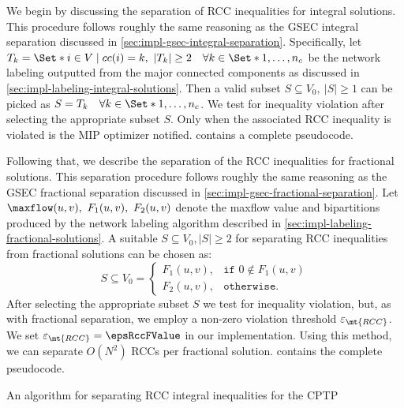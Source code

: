 We begin by discussing the separation of RCC inequalities for integral solutions.
This procedure follows roughly the same reasoning
as the GSEC integral separation discussed in \cref{sec:impl-gsec-integral-separation}.
Specifically, let $T_k  = \Set*{i \in V \mid cc(i) = k},\ |T_k| \ge 2 \quad \forall k \in \Set*{1, \dots, n_c}$
be the network labeling outputted from the major connected components as discussed in \cref{sec:impl-labeling-integral-solutions}.
Then a valid subset $S \subseteq V_0,\ |S| \ge 1$ can be picked as $S = T_k \quad \forall k \in \Set*{1, \dots, n_c}$.
We test for inequality violation after selecting the appropriate subset $S$.
Only when the associated RCC inequality is violated is the MIP optimizer notified.
 contains a complete pseudocode.

Following that, we describe the separation of the RCC inequalities for fractional solutions.
This separation procedure follows roughly the same reasoning
as the GSEC fractional separation discussed in \cref{sec:impl-gsec-fractional-separation}.
Let $\maxflow(u, v),\ F_1(u, v),\ F_2(u, v)$ denote the maxflow value and bipartitions
produced by the network labeling algorithm described in \cref{sec:impl-labeling-fractional-solutions}.
A suitable $S \subseteq V_0, |S| \ge 2$ for separating RCC inequalities
from fractional solutions can be chosen as:
\begin{equation}
	S \subseteq V_0 =
	\begin{cases}
		F_1(u, v), & \texttt{if } 0 \notin F_1(u, v) \\
		F_2(u, v), & \texttt{otherwise}.
	\end{cases}
\end{equation}
After selecting the appropriate subset $S$ we test for inequality violation, but,
as with fractional separation, we employ a non-zero violation threshold $\varepsilon_{\mt{RCC}}$.
We set $\varepsilon_{\mt{RCC}} = \epsRccFValue$ in our implementation.
Using this method, we can separate $O(N^2)$ RCCs per fractional solution.
 contains the complete pseudocode.

\begin{algorithm}
	\caption{An algorithm for separating RCC integral inequalities for the CPTP}
	\label{algo:rcc-integral-sep}
	
\end{algorithm}

